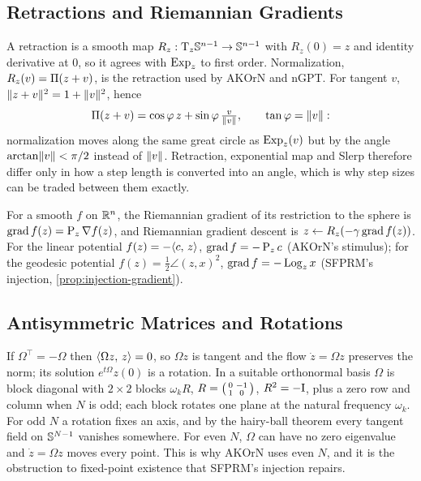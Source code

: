 \subsection{Retractions and Riemannian Gradients}

A retraction is a smooth map $R_z:\mathrm{T}_z\mathbb{S}^{n-1}\to\mathbb{S}^{n-1}$ with $R_z(0)=z$ and identity
derivative at $0$, so it agrees with $\operatorname{Exp}_z$ to first order. Normalization, $R_z(v)=\Pi(z+v)$, is
the retraction used by AKOrN and nGPT. For tangent $v$, $\lVert z+v\rVert^2=1+\lVert v\rVert^2$, hence
\begin{equation}
  \Pi(z+v) = \cos\varphi\,z+\sin\varphi\,\tfrac{v}{\lVert v\rVert},\qquad \tan\varphi=\lVert v\rVert:
\end{equation}
normalization moves along the same great circle as $\operatorname{Exp}_z(v)$ but by the angle $\arctan\lVert v\rVert<\pi/2$
instead of $\lVert v\rVert$. Retraction, exponential map and Slerp therefore differ only in how a step
length is converted into an angle, which is why step sizes can be traded between them exactly.

For a smooth $f$ on $\mathbb{R}^n$, the Riemannian gradient of its restriction to the sphere is
$\operatorname{grad} f(z)=\operatorname{P}_z\nabla f(z)$, and Riemannian gradient descent is
$z\leftarrow R_z(-\gamma\operatorname{grad} f(z))$. For the linear potential $f(z)=-\langle c,\, z\rangle$,
$\operatorname{grad} f=-\operatorname{P}_zc$ (AKOrN's stimulus); for the geodesic potential $f(z)=\tfrac12\angle(z,x)^2$,
$\operatorname{grad} f=-\operatorname{Log}_zx$ (SFPRM's injection, \cref{prop:injection-gradient}).

\subsection{Antisymmetric Matrices and Rotations}

If $\Omega^\top=-\Omega$ then $\langle \Omega z,\, z\rangle=0$, so $\Omega z$ is tangent and the flow
$\dot z=\Omega z$ preserves the norm; its solution $e^{t\Omega}z(0)$ is a rotation. In a suitable
orthonormal basis $\Omega$ is block diagonal with $2\times2$ blocks $\omega_kR$,
$R=\begin{psmallmatrix}0&-1\\1&0\end{psmallmatrix}$, $R^2=-\mathrm{I}$, plus a zero row and column when $N$
is odd; each block rotates one plane at the natural frequency $\omega_k$. For odd $N$ a rotation fixes
an axis, and by the hairy-ball theorem every tangent field on $\mathbb{S}^{N-1}$ vanishes somewhere. For even
$N$, $\Omega$ can have no zero eigenvalue and $\dot z=\Omega z$ moves every point. This is why AKOrN uses
even $N$, and it is the obstruction to fixed-point existence that SFPRM's injection repairs.

